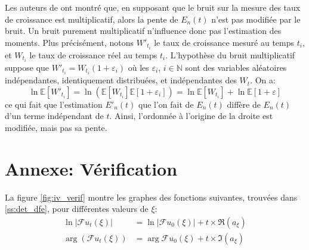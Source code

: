 \documentclass[12pt]{article}
\newcommand{\pth}[1]{\left(#1\right)}
\newcommand{\cro}[1]{\left[#1\right]}
\newcommand{\abs}[1]{\left|#1\right|}
\newcommand{\En}{\mathbb{N}}
\newcommand{\Esp}[1]{\mathbb{E}\cro{#1}}
\newcommand{\fr}{\mathcal{F}}
\begin{document}
Les auteurs de \cite{rob} ont montré que, en supposant que le bruit sur la mesure des taux de croissance est multiplicatif, alors la pente de $E_n(t)$ n'est pas modifiée par le bruit. Un bruit purement multiplicatif n'influence donc pas l'estimation des moments. Plus précisément, notons $W'_{t_i}$ le taux de croissance mesuré au temps $t_i$, et $W_{t_i}$ le taux de croissance réel au temps $t_i$. L'hypothèse du bruit multiplicatif suppose que $W'_{t_i}=W_{t_i}(1+\varepsilon_i)$ où les $\varepsilon_i$, $i\in\En$ sont des variables aléatoires indépendantes, identiquement distribuées, et indépendantes des $W_t$. On a:
\[\ln\Esp{W'_{t_i}}=\ln\pth{\Esp{W_{t_i}}\Esp{1+\varepsilon_i}}=\ln\Esp{W_{t_i}}+\ln\Esp{1+\varepsilon}\]
ce qui fait que l'estimation $E'_n(t)$ que l'on fait de $E_n(t)$ diffère de $E_n(t)$ d'un terme indépendant de $t$. Ainsi, l'ordonnée à l'origine de la droite est modifiée, mais pas sa pente.



\FloatBarrier
\section{Annexe: Vérification\label{ann:verif}}

La figure \ref{fig:iv_verif} montre les graphes des fonctions suivantes, trouvées dans \ref{ss:det_dfe}, pour différentes valeurs de $\xi$:
\begin{align*}
  \ln\abs{\fr u_t(\xi)}&=\ln\abs{\fr u_0(\xi)}+t\times\Re(a_{\xi})\\
  \arg\pth{\fr u_t(\xi)}&=\arg{\fr u_0(\xi)}+t\times\Im(a_{\xi})
\end{align*}
\end{document}

